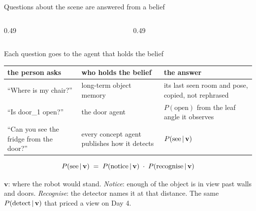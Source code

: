 \documentclass[10pt, aspectratio=169]{beamer}
\newlength{\cwid}\setlength{\cwid}{14.3cm}
\newlength{\bw}\setlength{\bw}{9.2cm}
\newcommand{\chatstart}{\coordinate (c0) at (0,0);}
\newcommand{\youb}[3]{\path let \p1=(#2.south) in node[ybub, anchor=north east] (#1) at (\cwid,\y1-4pt) {#3};}
\newcommand{\botb}[3]{\path let \p1=(#2.south) in node[bbub, anchor=north west] (#1) at (0,\y1-4pt) {#3};}
\begin{document}
\begin{frame}{Questions about the scene are answered from a belief}
  \begin{columns}[T]
    \begin{column}{0.49\textwidth}
    \end{column}
    \begin{column}{0.49\textwidth}
    \end{column}
  \end{columns}
\end{frame}

\begin{frame}[t]{Each question goes to the agent that holds the belief}
  \centering\small
  \renewcommand{\arraystretch}{1.25}
  \begin{tabular}{@{}p{3.9cm} p{3.6cm} p{5.3cm}@{}}
    \toprule
    the person asks & who holds the belief & the answer \\
    \midrule
    ``Where is my chair?'' & long-term object memory & its last seen room and pose, copied, not rephrased \\
    ``Is door\_1 open?'' & the door agent & $P(\text{open})$ from the leaf angle it observes \\
    ``Can you see the fridge from the door?'' & every concept agent publishes how it detects & $P(\text{see}\,|\,\mathbf v)$ \\
    \bottomrule
  \end{tabular}

  \vspace{-0.3em}
  \[
    P(\text{see}\,|\,\mathbf v) \;=\; P(\text{notice}\,|\,\mathbf v)\;\cdot\;P(\text{recognise}\,|\,\mathbf v)
  \]
  \raggedright\small
  $\mathbf v$: where the robot would stand. \emph{Notice}: enough of the object is in view past walls and
  doors. \emph{Recognise}: the detector names it at that distance. The same $P(\text{detect}\,|\,\mathbf v)$
  that priced a view on Day 4.
\end{frame}
\end{document}
